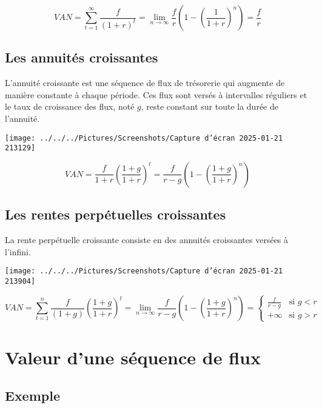 \documentclass[a4paper, 12pt]{report}
\begin{document}
\[ VAN =\sum_{t=1}^{\infty}\frac{f}{(1+r)^t}= \lim_{n\rightarrow \infty}\frac{f}{r}\left( 1-\left( \frac{1}{1+r}\right) ^n\right)=\frac{f}{r} \]

\subsection{Les annuités croissantes}

L'annuité croissante est une séquence de flux de trésorerie qui augmente de manière constante à chaque période. Ces flux sont versés à intervalles réguliers et le taux de croissance des flux, noté \( g \), reste constant sur toute la durée de l'annuité.

\begin{center}
\texttt{[image: ../../../Pictures/Screenshots/Capture d'écran 2025-01-21 213129]}
\end{center}

\[ VAN = \frac{f}{1+r}\left( \frac{1+g}{1+r} \right)^t=\frac{f}{r-g}\left( 1-\left( \frac{1+g}{1+r} \right)^n \right) \]

\subsection{Les rentes perpétuelles croissantes}

La rente perpétuelle croissante consiste en des annuités croissantes versées à l'infini.

\begin{center}
\texttt{[image: ../../../Pictures/Screenshots/Capture d'écran 2025-01-21 213904]}
\end{center}

\[
VAN = \sum_{t=1}^{n} \frac{f}{(1+g)} \left( \frac{1+g}{1+r} \right)^{t} = \lim_{n \to \infty} \frac{f}{r-g} \left( 1 - \left( \frac{1+g}{1+r} \right)^{n} \right) = \begin{cases} 
	\frac{f}{r-g} & \text{si } g < r \\ 
	+\infty & \text{si } g > r 
\end{cases}
\]

\section{Valeur d’une séquence de flux}

\subsection{Exemple}
\end{document}
